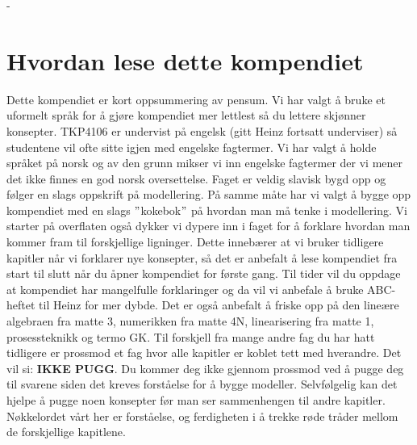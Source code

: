 \clearpage-
\section{Hvordan lese dette kompendiet}\label{sec:lese}
Dette kompendiet er kort oppsummering av pensum. Vi har valgt å bruke et uformelt språk for å gjøre kompendiet mer lettlest så du lettere skjønner konsepter. TKP4106 er undervist på engelsk (gitt Heinz fortsatt underviser) så studentene vil ofte sitte igjen med engelske fagtermer. Vi har valgt å holde språket på norsk og av den grunn mikser vi inn engelske fagtermer der vi mener det ikke finnes en god norsk oversettelse. Faget er veldig slavisk bygd opp og følger en slags oppskrift på modellering. På samme måte har vi valgt å bygge opp kompendiet med en slags $"$kokebok$"$ på hvordan man må tenke i modellering. Vi starter på overflaten også dykker vi dypere inn i faget for å forklare hvordan man kommer fram til forskjellige ligninger. Dette innebærer at vi bruker tidligere kapitler når vi forklarer nye konsepter, så det er anbefalt å lese kompendiet fra start til slutt når du åpner kompendiet for første gang. Til tider vil du oppdage at kompendiet har mangelfulle forklaringer og da vil vi anbefale å bruke ABC-heftet til Heinz for mer dybde. Det er også anbefalt å friske opp på den lineære algebraen fra matte 3, numerikken fra matte 4N, linearisering fra matte 1, prosessteknikk og termo GK. Til forskjell fra mange andre fag du har hatt tidligere er prossmod et fag hvor alle kapitler er koblet tett med hverandre. Det vil si: \textbf{IKKE PUGG}. Du kommer deg ikke gjennom prossmod ved å pugge deg til svarene siden det kreves forståelse for å bygge modeller. Selvfølgelig kan det hjelpe å pugge noen konsepter før man ser sammenhengen til andre kapitler. Nøkkelordet vårt her er forståelse, og ferdigheten i å trekke røde tråder mellom de forskjellige kapitlene. 
